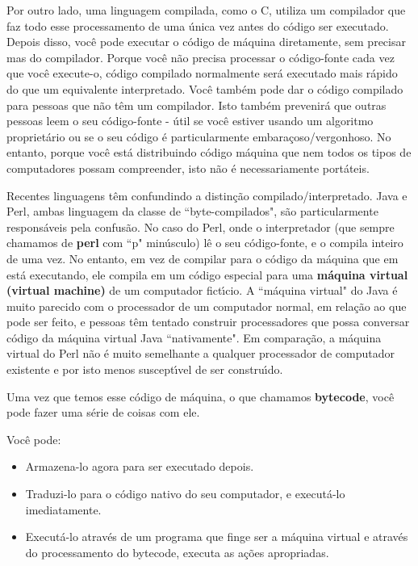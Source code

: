 \documentclass[a4paper,12pt,twoside]{book}
\begin{document}
\noindent Por outro lado, uma linguagem compilada, como o C, utiliza um compilador que faz todo esse processamento 
de uma única vez antes do c\'odigo ser executado. Depois disso, voc\^e pode executar o c\'odigo de m\'aquina diretamente, 
sem precisar mas do compilador. Porque voc\^e n\~ao precisa processar o c\'odigo-fonte cada vez que voc\^e execute-o, 
c\'odigo compilado normalmente ser\'a executado mais r\'apido do que um equivalente interpretado. Voc\^e tamb\'em pode dar 
o c\'odigo compilado para pessoas que n\~ao t\^em um compilador. Isto tamb\'em prevenir\'a que outras pessoas leem
o seu c\'odigo-fonte - \'util se voc\^e estiver usando um algoritmo propriet\'ario ou se o seu c\'odigo \'e 
particularmente embara\c{c}oso/vergonhoso. No entanto, porque voc\^e est\'a distribuindo c\'odigo m\'aquina que nem 
todos os tipos de computadores possam compreender, isto n\~ao \'e necessariamente port\'ateis.\medskip

\noindent Recentes linguagens t\^em confundindo a distin\c{c}\~ao compilado/interpretado. Java e Perl, 
ambas linguagem da classe  de ``byte-compilados", s\~ao particularmente respons\'aveis pela confus\~ao. 
No caso do Perl, onde o interpretador (que sempre chamamos de \textbf{perl} com ``p" min\'usculo) l\^e 
o seu c\'odigo-fonte, e o compila inteiro de uma vez. No entanto, em vez de compilar para o c\'odigo 
da m\'aquina que em est\'a executando, ele compila em um c\'odigo especial para uma \textbf{m\'aquina 
virtual (virtual machine)} de um computador fict\'{\i}cio. A ``m\'aquina virtual" do Java \'e muito 
parecido com o processador de um computador normal, em rela\c{c}\~ao ao que pode ser feito, e 
pessoas t\^em tentado construir processadores que possa conversar c\'odigo da m\'aquina virtual 
Java ``nativamente". Em compara\c{c}\~ao, a m\'aquina virtual do Perl n\~ao \'e muito semelhante 
a qualquer processador de  computador existente e por isto menos suscept\'{\i}vel de ser constru\'{\i}do.\medskip

\noindent Uma vez que temos esse c\'odigo de m\'aquina, o que chamamos \textbf{bytecode}, voc\^e pode 
fazer uma s\'erie de coisas com ele.\medskip

\noindent Voc\^e pode:

\begin{itemize}

 \item Armazena-lo agora para ser executado depois.

 \item Traduzi-lo para o c\'odigo nativo do seu computador, e execut\'a-lo imediatamente.

 \item Execut\'a-lo atrav\'es de um programa que finge ser a m\'aquina virtual e atrav\'es do 
processamento do bytecode, executa as a\c{c}\~oes apropriadas.

\end{itemize}
\end{document}
